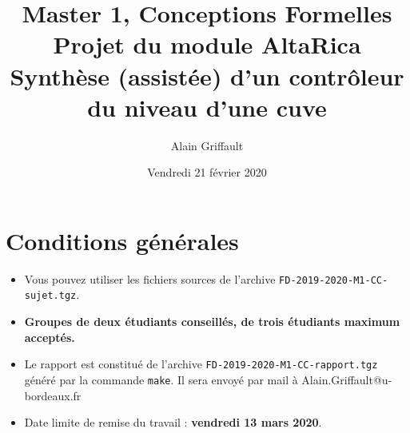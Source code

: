 \documentclass[a4paper]{article}
\newcommand{\altarica}{{\sc AltaRica}}
\begin{document}
\title{Master 1, Conceptions Formelles\\
Projet du module \altarica\\
Synthèse (assistée) d'un contrôleur du niveau d'une cuve}

\date{Vendredi 21 février 2020}

\author{Alain Griffault}

\maketitle



\section{Conditions générales}

\begin{itemize}
\item Vous pouvez utiliser les fichiers sources de l'archive {\tt FD-2019-2020-M1-CC-sujet.tgz}.
\item {\bf Groupes de deux étudiants conseillés, de trois étudiants maximum acceptés.}
\item Le rapport est constitué de l'archive {\tt FD-2019-2020-M1-CC-rapport.tgz} généré par la commande {\tt make}. Il sera envoyé par mail à Alain.Griffault@u-bordeaux.fr
\item Date limite de remise du travail : {\bf vendredi 13 mars 2020}.
\end{itemize}
\end{document}
